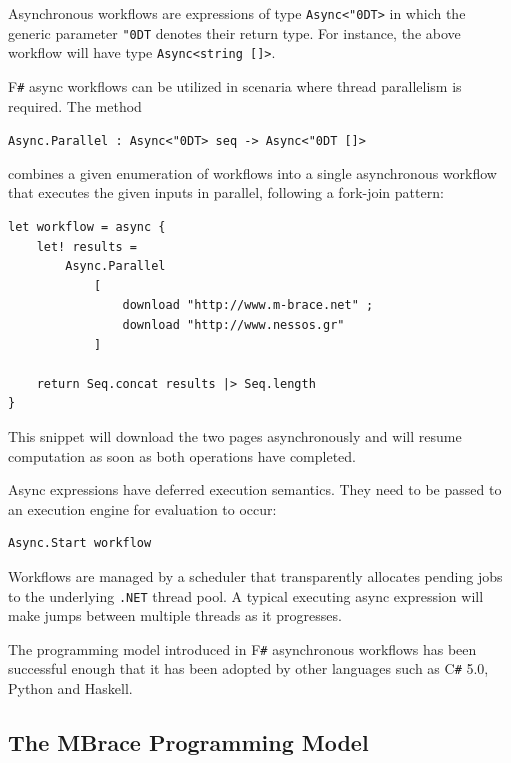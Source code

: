 \documentclass[9pt,a4paper]{article}
\newcommand{\TitularMbrace}{MBrace}
\newcommand{\fsharp}{F\texttt \#}
\newcommand{\csharp}{C\texttt \#}
\newcommand{\dotnet}{\texttt{\hbox{.}NET}}
\newcommand{\centertt}[1]{\begin{center}\texttt{#1}\end{center}}
\newcommand{\uq}{\char"0D}
\begin{document}
Asynchronous workflows are expressions of type \texttt{Async<\uq{}T>}
in which the generic parameter \texttt{\uq{}T} denotes their return type.
For instance, the above workflow will have type \texttt{Async<string []>}.

\fsharp{} async workflows can be utilized in scenaria where thread parallelism is required. 
The method
\centertt{Async.Parallel : Async<\uq{}T> seq -> Async<\uq{}T []>}
combines a given enumeration of workflows into a single asynchronous workflow 
that executes the given inputs in parallel, following a fork-join pattern:
\begin{lstlisting}
let workflow = async {
    let! results = 
        Async.Parallel 
            [ 
                download "http://www.m-brace.net" ;
                download "http://www.nessos.gr" 
            ]
 
    return Seq.concat results |> Seq.length
}
\end{lstlisting}
This snippet will download the two pages asynchronously and will resume computation 
as soon as both operations have completed.

Async expressions have deferred execution semantics. They need to be passed to an
execution engine for evaluation to occur:
\begin{lstlisting} 
Async.Start workflow
\end{lstlisting}
Workflows are managed by a scheduler that transparently allocates pending jobs to the 
underlying \dotnet{} thread pool. A typical executing async expression will make jumps 
between multiple threads as it progresses.

The programming model introduced in \fsharp{} asynchronous workflows has been successful
enough that it has been adopted by other languages such as \csharp{} 5.0, Python and Haskell.

\subsection{The \TitularMbrace{} Programming Model}
\end{document}
